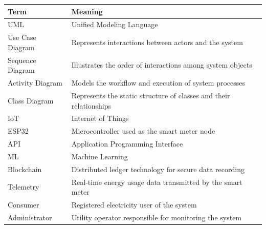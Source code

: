 \renewcommand{\arraystretch}{1.3}
\begin{tabular}{|p{3cm}|p{10cm}|}
\hline
\textbf{Term} & \textbf{Meaning} \\ \hline
UML & Unified Modeling Language \\ \hline
Use Case Diagram & Represents interactions between actors and the system \\ \hline
Sequence Diagram & Illustrates the order of interactions among system objects \\ \hline
Activity Diagram & Models the workflow and execution of system processes \\ \hline
Class Diagram & Represents the static structure of classes and their relationships \\ \hline
IoT & Internet of Things \\ \hline
ESP32 & Microcontroller used as the smart meter node \\ \hline
API & Application Programming Interface \\ \hline
ML & Machine Learning \\ \hline
Blockchain & Distributed ledger technology for secure data recording \\ \hline
Telemetry & Real-time energy usage data transmitted by the smart meter \\ \hline
Consumer & Registered electricity user of the system \\ \hline
Administrator & Utility operator responsible for monitoring the system \\ \hline
\end{tabular}
